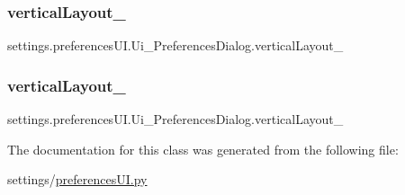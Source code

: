 \subsubsection{\texorpdfstring{vertical\+Layout\+\_}{verticalLayout\_4}}
{\footnotesize\ttfamily settings.\+preferences\+U\+I.\+Ui\+\_\+\+Preferences\+Dialog.\+vertical\+Layout\+\_}

\hypertarget{a00106_a770a35129466bdc08cfc70c1a31d74d0}{}\label{a00106_a770a35129466bdc08cfc70c1a31d74d0} 
\subsubsection{\texorpdfstring{vertical\+Layout\+\_}{verticalLayout\_5}}
{\footnotesize\ttfamily settings.\+preferences\+U\+I.\+Ui\+\_\+\+Preferences\+Dialog.\+vertical\+Layout\+\_}



The documentation for this class was generated from the following file\+:\begin{DoxyCompactItemize}
\item 
settings/\hyperlink{a00032}{preferences\+U\+I.\+py}\end{DoxyCompactItemize}
